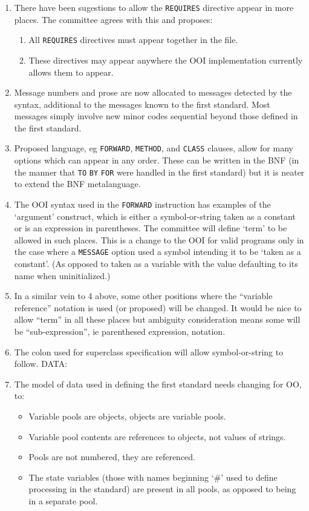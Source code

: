 \begin{enumerate}
\def\labelenumi{\arabic{enumi}.}
\item
  There have been sugestions to allow the \texttt{REQUIRES} directive
  appear in more places. The committee agrees with this and proposes:

  \begin{enumerate}
  \def\labelenumii{\Alph{enumii})}
  \item
    All \texttt{REQUIRES} directives must appear together in the file.
  \item
    These directives may appear anywhere the OOI implementation
    currently allows them to appear.
  \end{enumerate}
\item
  Message numbers and prose are now allocated to messages detected by
  the syntax, additional to the messages known to the first standard.
  Most messages simply involve new minor codes sequential beyond those
  defined in the first standard.
\item
  Proposed language, eg \texttt{FORWARD}, \texttt{METHOD}, and
  \texttt{CLASS} clauses, allow for many options which can appear in any
  order. These can be written in the BNF (in the manner that \texttt{TO}
  \texttt{BY} \texttt{FOR} were handled in the first standard) but it is
  neater to extend the BNF metalanguage.
\item
  The OOI syntax used in the \texttt{FORWARD} instruction has examples
  of the `argument' construct, which is either a symbol-or-string taken
  as a constant or is an expression in parentheses. The committee will
  define `term' to be allowed in such places. This is a change to the
  OOI for valid programs only in the case where a \texttt{MESSAGE}
  option used a symbol intending it to be `taken as a constant'. (As
  opposed to taken as a variable with the value defaulting to its name
  when uninitialized.)
\item
  In a similar vein to 4 above, some other positions where the
  ``variable reference'' notation is used (or proposed) will be changed.
  It would be nice to allow ``term'' in all these places but ambiguity
  consideration means some will be ``sub-expression'', ie parenthesed
  expression, notation.
\item
  The colon used for superclass specification will allow
  symbol-or-string to follow. DATA:
\item
  The model of data used in defining the first standard needs changing
  for OO, to:

  \begin{itemize}
  \item
    Variable pools are objects, objects are variable pools.
  \item
    Variable pool contents are references to objects, not values of
    strings.
  \item
    Pools are not numbered, they are referenced.
  \item
    The state variables (those with names beginning `\#' used to define
    processing in the standard) are present in all pools, as opposed to
    being in a separate pool.
  \end{itemize}
\end{enumerate}

